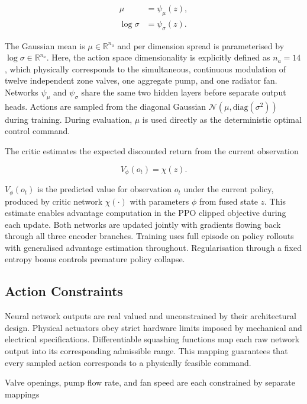 \documentclass[twocolumn]{article}
\begin{document}
\begin{align}
\mu &= \psi_{\mu}(z),\\
\log \sigma &= \psi_{\sigma}(z).
\end{align}

The Gaussian mean is $\mu \in \mathbb{R}^{n_a}$ and per dimension spread is parameterised by $\log \sigma \in \mathbb{R}^{n_a}$. Here, the action space dimensionality is explicitly defined as $n_a=14$, which physically corresponds to the simultaneous, continuous modulation of twelve independent zone valves, one aggregate pump, and one radiator fan. Networks $\psi_{\mu}$ and $\psi_{\sigma}$ share the same two hidden layers before separate output heads. Actions are sampled from the diagonal Gaussian $\mathcal{N}(\mu, \mathrm{diag}(\sigma^2))$ during training. During evaluation, $\mu$ is used directly as the deterministic optimal control command.

The critic estimates the expected discounted return from the current observation

\begin{equation}
V_{\phi}(o_t) = \chi(z).
\end{equation}

$V_{\phi}(o_t)$ is the predicted value for observation $o_t$ under the current policy, produced by critic network $\chi(\cdot)$ with parameters $\phi$ from fused state $z$. This estimate enables advantage computation in the PPO clipped objective during each update. Both networks are updated jointly with gradients flowing back through all three encoder branches. Training uses full episode on policy rollouts with generalised advantage estimation throughout. Regularisation through a fixed entropy bonus controls premature policy collapse.

\subsection*{Action Constraints}

Neural network outputs are real valued and unconstrained by their architectural design. Physical actuators obey strict hardware limits imposed by mechanical and electrical specifications. Differentiable squashing functions map each raw network output into its corresponding admissible range. This mapping guarantees that every sampled action corresponds to a physically feasible command.

Valve openings, pump flow rate, and fan speed are each constrained by separate mappings
\end{document}
